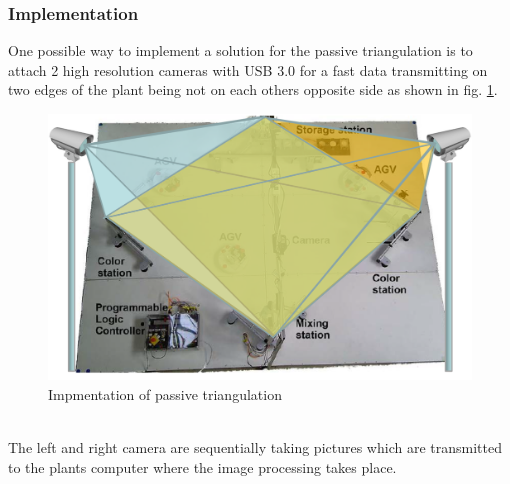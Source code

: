 \subsubsection*{Implementation} 
One possible way to implement a solution for the passive triangulation is to attach 2 high resolution cameras with USB 3.0 for a fast data transmitting on two edges of the plant being not on each others opposite side as shown in fig. \ref{ativeTriangulationimplementation}.\\
\begin{figure}[!htbp]
	\centering
	\includegraphics[width = 16cm]{Pictures/triangulationimplementatio}
	\caption{Impmentation of passive triangulation}
	\label{ativeTriangulationimplementation}
\end{figure}\\%
The left and right camera are sequentially taking pictures which are transmitted to the plants computer where the image processing takes place. 
\pagebreak
